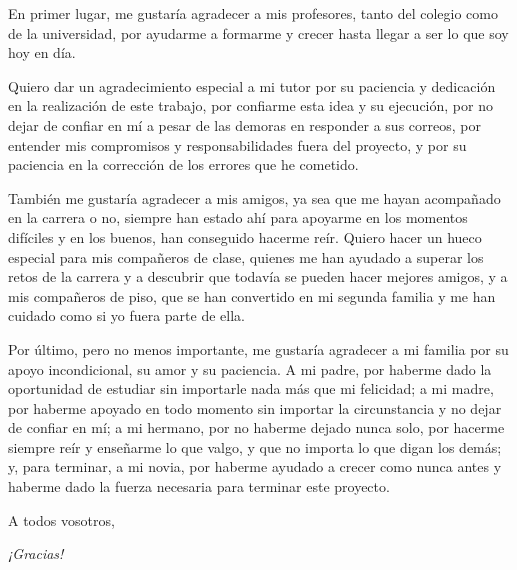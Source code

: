 En primer lugar, me gustaría agradecer a mis profesores, tanto del colegio como de la universidad, por ayudarme a formarme y crecer hasta llegar a ser lo que soy hoy en día.

Quiero dar un agradecimiento especial a mi tutor por su paciencia y dedicación en la realización de este trabajo, por confiarme esta idea y su ejecución, por no dejar de confiar en mí a pesar de las demoras en responder a sus correos, por entender mis compromisos y responsabilidades fuera del proyecto, y por su paciencia en la corrección de los errores que he cometido.

También me gustaría agradecer a mis amigos, ya sea que me hayan acompañado en la carrera o no, siempre han estado ahí para apoyarme en los momentos difíciles y en los buenos, han conseguido hacerme reír. Quiero hacer un hueco especial para mis compañeros de clase, quienes me han ayudado a superar los retos de la carrera y a descubrir que todavía se pueden hacer mejores amigos, y a mis compañeros de piso, que se han convertido en mi segunda familia y me han cuidado como si yo fuera parte de ella.

Por último, pero no menos importante, me gustaría agradecer a mi familia por su apoyo incondicional, su amor y su paciencia. A mi padre, por haberme dado la oportunidad de estudiar sin importarle nada más que mi felicidad; a mi madre, por haberme apoyado en todo momento sin importar la circunstancia y no dejar de confiar en mí; a mi hermano, por no haberme dejado nunca solo, por hacerme siempre reír y enseñarme lo que valgo, y que no importa lo que digan los demás; y, para terminar, a mi novia, por haberme ayudado a crecer como nunca antes y haberme dado la fuerza necesaria para terminar este proyecto.

A todos vosotros,
\begin{center}
  \textit{¡Gracias!}
\end{center}